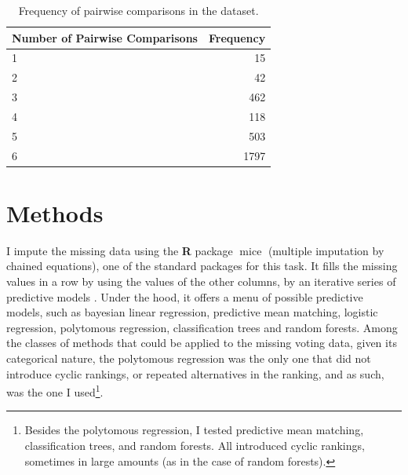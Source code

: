 \documentclass[hidelinks,11pt]{article} \usepackage[utf8]{inputenc}
\begin{document}
\begin{table}[!h]\centering
\begin{tabular}{lr}
\hline
Number of Pairwise Comparisons & Frequency \\ \hline
1                              & 15        \\
2                              & 42        \\
3                              & 462       \\
4                              & 118       \\
5                              & 503       \\
6                              & 1797      \\ \hline
\end{tabular}


\caption{Frequency of pairwise comparisons in the dataset.}

\label{Tab:Tcpairwise}
\end{table}


\section{Methods}

I impute the missing data using the \textbf{\textsf{R}} package
\(\operatorname{mice}\) (multiple imputation by chained equations), one of the
standard packages for this task. It fills the missing values in a row by using
the values of the other columns, by an iterative series of predictive models
\parencite{vanbuuren2018imputation}. Under the hood, it offers a menu of
possible predictive models, such as bayesian linear regression, predictive mean
matching, logistic regression, polytomous regression, classification trees and
random forests. Among the classes of methods that could be applied to the
missing voting data, given its categorical nature, the polytomous regression was
the only one that did not introduce cyclic rankings, or repeated alternatives in
the ranking, and as such, was the one I used\footnote{Besides the polytomous
regression, I tested predictive mean matching, classification trees, and random
forests. All introduced cyclic rankings, sometimes in large amounts (as in the
case of random forests).}.
\end{document}
